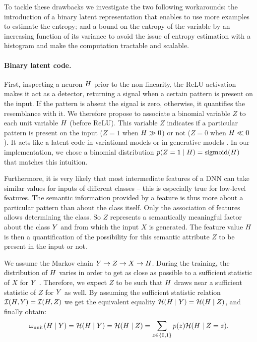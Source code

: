     To tackle these drawbacks we investigate the two following workarounds: the introduction of a binary latent representation that enables to use more examples to estimate the entropy; and a bound on the entropy of the variable by an increasing function of its variance to avoid the issue of entropy estimation with a histogram and make the computation tractable and scalable.

    \paragraph{Binary latent code.}

        First, inspecting a neuron $H$ prior to the non-linearity, the \acs{ReLU} activation makes it act as a detector, returning a signal when a certain pattern is present on the input. If the pattern is absent the signal is zero, otherwise, it quantifies the resemblance with it.
        We therefore propose to associate a binomial variable $Z$ to each unit variable $H$ (before \acs{ReLU}). This variable $Z$ indicates if a particular pattern is present on the input ($Z=1$ when $H \gg 0$) or not ($Z=0$ when $H \ll 0$).
        It acts like a latent code in variational models \citep[\textit{e.g.}][]{aevb} or in generative models \citep[\textit{e.g.}][]{infogan}.
        In our implementation, we chose a binomial distribution $p(Z=1\mid H)=\mathrm{sigmoid}(H)$ that matches this intuition. 
        
        Furthermore, it is very likely that most intermediate features of a \ac{DNN} can take similar values for inputs of different classes -- this is especially true for low-level features. The semantic information provided by a feature is thus more about a particular pattern than about the class itself. Only the association of features allows determining the class. So $Z$ represents a semantically meaningful factor about the class $Y$ and from which the input $X$ is generated. The feature value $H$ is then a quantification of the possibility for this semantic attribute $Z$ to be present in the input or not.
        
        We assume the Markov chain $Y \rightarrow Z \rightarrow X \rightarrow H$. During the training, the distribution of $H$ varies in order to get as close as possible to a sufficient statistic of $X$ for $Y$ \citep[see definition by][]{element}. Therefore, we expect $Z$ to be such that $H$ draws near a sufficient statistic of $Z$ for $Y$ as well. By assuming the sufficient statistic relation $\mathcal{I}(H, Y) = \mathcal{I}(H, Z)$ we get the equivalent equality $\mathcal{H}(H\mid Y)= \mathcal{H}(H\mid Z)$, and finally obtain:
        \begin{equation}
            \omega_{\mathrm{unit}}(H\mid Y) = \mathcal{H}(H\mid Y)= \mathcal{H}(H\mid Z) = \sum_{z\in\{0,1\}} p(z) \mathcal{H}(H\mid Z=z).
        \end{equation}
        
